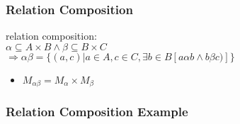 \documentclass[dvipsnames]{beamer}
\begin{document}
\begin{frame}
  \frametitle{Relation Composition}

  \begin{definition}
    \alert{relation composition}:\\
      $\alpha \subseteq A \times B \wedge \beta \subseteq B \times C$\\
      $\Rightarrow \alpha \beta = \{(a,c) | a \in A, c \in C,
                \exists b \in B [a \alpha b \wedge b \beta c)]\}$
  \end{definition}

  \begin{itemize}
    \item $M_{\alpha \beta} = M_{\alpha} \times M_{\beta}$
  \end{itemize}
\end{frame}

\begin{frame}
  \frametitle{Relation Composition Example}

  \begin{example}
    \begin{columns}
      \begin{center}
      \end{center}

      \begin{center}
      \end{center}
    \end{columns}
  \end{example}
\end{frame}
\end{document}
